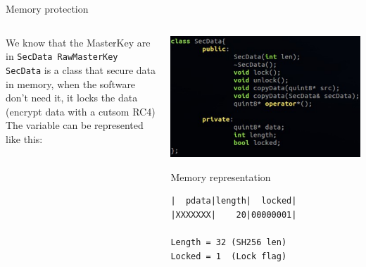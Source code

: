 \documentclass[compress]{beamer}
\begin{document}
\begin{frame}[fragile]{Memory protection}
  \begin{columns}[T]
    \begin{column}{.4\textwidth}
  We know that the MasterKey are in \verb|SecData RawMasterKey|\\
  \vspace{0.1in}
  \verb|SecData| is a class that secure data in memory, when the software don't need it, it locks the data (encrypt data with a cutsom RC4)\\
  \vspace{0.1in}
  The variable can be represented like this:
    \end{column}
    \begin{column}{.6\textwidth}
  \includegraphics[scale=0.35]{img/keypass_secdata.eps}
     \begin{block}{Memory representation}
  \begin{lstlisting}
|  pdata|length|  locked|
|XXXXXXX|    20|00000001|

Length = 32 (SH256 len)
Locked = 1  (Lock flag)
  \end{lstlisting}
      \end{block}
    \end{column}
  \end{columns}
\end{frame}
\end{document}
